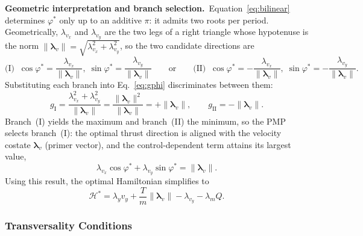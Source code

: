\documentclass[../main.tex]{subfiles}
\begin{document}
\textbf{Geometric interpretation and branch selection.}\ Equation~\eqref{eq:bilinear} determines $\varphi^*$ only up to an additive $\pi$: it admits two roots per period. Geometrically, $\lambda_{v_x}$ and $\lambda_{v_y}$ are the two legs of a right triangle whose hypotenuse is the norm $\|\boldsymbol{\lambda}_v\| = \sqrt{\lambda_{v_x}^2 + \lambda_{v_y}^2}$, so the two candidate directions are
\begin{equation}
    \text{(I)}\;\;
    \cos\varphi^* = \frac{\lambda_{v_x}}{\|\boldsymbol{\lambda}_v\|},\;
    \sin\varphi^* = \frac{\lambda_{v_y}}{\|\boldsymbol{\lambda}_v\|}
    \qquad\text{or}\qquad
    \text{(II)}\;\;
    \cos\varphi^* = -\frac{\lambda_{v_x}}{\|\boldsymbol{\lambda}_v\|},\;
    \sin\varphi^* = -\frac{\lambda_{v_y}}{\|\boldsymbol{\lambda}_v\|}.
    \label{eq:two_cases}
\end{equation}
Substituting each branch into Eq.~\eqref{eq:gphi} discriminates between them:
\begin{equation}
    g_\mathrm{I} = \frac{\lambda_{v_x}^2 + \lambda_{v_y}^2}{\|\boldsymbol{\lambda}_v\|}
    = \frac{\|\boldsymbol{\lambda}_v\|^2}{\|\boldsymbol{\lambda}_v\|} = +\|\boldsymbol{\lambda}_v\|,
    \qquad
    g_\mathrm{II} = -\|\boldsymbol{\lambda}_v\|.
\end{equation}
Branch~(I) yields the maximum and branch~(II) the minimum, so the PMP selects branch~(I): the optimal thrust direction is aligned with the velocity costate $\boldsymbol{\lambda}_v$ (primer vector), and the control-dependent term attains its largest value,
\begin{equation}
    \lambda_{v_x}\cos\varphi^* + \lambda_{v_y}\sin\varphi^* = \|\boldsymbol{\lambda}_v\|.
    \label{eq:maxcond}
\end{equation}
Using this result, the optimal Hamiltonian simplifies to
\begin{equation}
    \mathcal{H}^* = \lambda_y v_y + \frac{T}{m}\|\boldsymbol{\lambda}_v\| - \lambda_{v_y} - \lambda_m Q.
    \label{eq:ham_opt}
\end{equation}

\subsubsection{Transversality Conditions}\label{sec:transversality}
\end{document}
